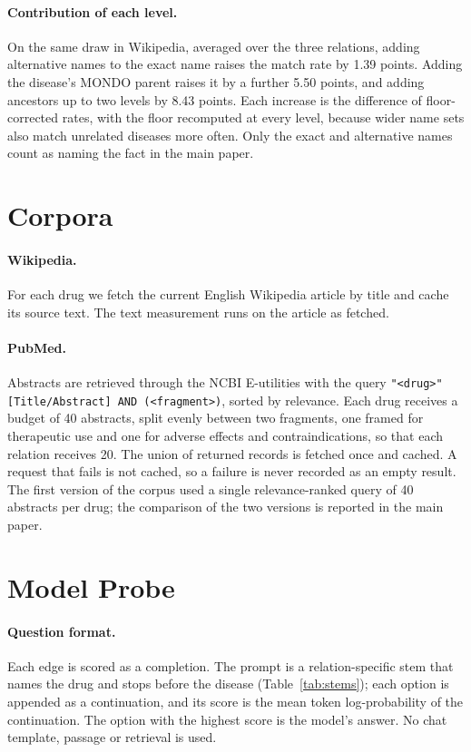 \documentclass[letterpaper]{article} %
\begin{document}
\paragraph{Contribution of each level.}
On the same draw in Wikipedia, averaged over the three relations, adding
alternative names to the exact name raises the match rate by 1.39 points.
Adding the disease's MONDO parent raises it by a further 5.50 points, and
adding ancestors up to two levels by 8.43 points. Each increase is the
difference of floor-corrected rates, with the floor recomputed at every
level, because wider name sets also match unrelated diseases more often. Only the exact and
alternative names count as naming the fact in the main paper.

\section{Corpora}

\paragraph{Wikipedia.}
For each drug we fetch the current English Wikipedia article by title and
cache its source text. The text measurement runs on the article as fetched.

\paragraph{PubMed.}
Abstracts are retrieved through the NCBI E-utilities \citep{sayers2009eutils}
with the query \texttt{"<drug>"[Title/Abstract] AND (<fragment>)}, sorted by
relevance. Each drug receives a budget of 40 abstracts, split evenly between
two fragments, one framed for therapeutic use and one for adverse effects and
contraindications, so that each relation receives 20. The union of returned
records is fetched once and cached. A request that fails is not cached, so a
failure is never recorded as an empty result. The first version of the corpus
used a single relevance-ranked query of 40 abstracts per drug; the comparison
of the two versions is reported in the main paper.

\section{Model Probe}

\paragraph{Question format.}
Each edge is scored as a completion. The prompt is a relation-specific stem
that names the drug and stops before the disease (Table~\ref{tab:stems}); each
option is appended as a continuation, and its score is the mean token
log-probability of the continuation. The option with the highest score is the
model's answer. No chat template, passage or retrieval is used.
\end{document}
